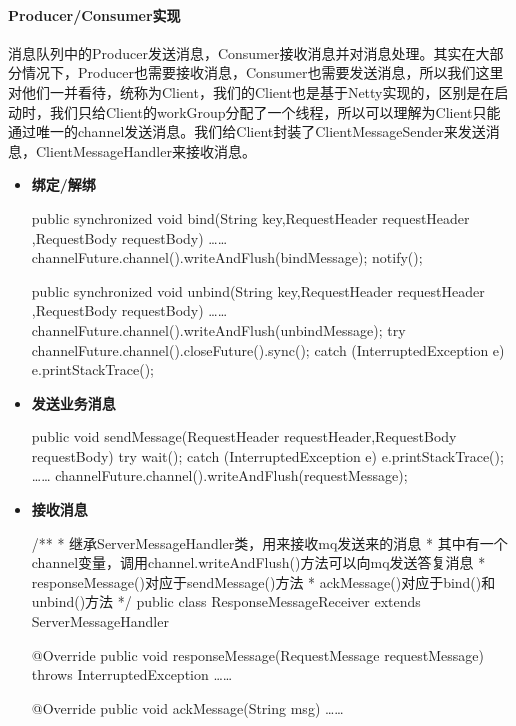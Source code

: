 \documentclass[a4paper, 12pt]{article}
\theoremstyle{definition}
\begin{document}
\paragraph{Producer/Consumer实现}
消息队列中的Producer发送消息，Consumer接收消息并对消息处理。其实在大部分情况下，Producer也需要接收消息，Consumer也需要发送消息，所以我们这里对他们一并看待，统称为Client，我们的Client也是基于Netty实现的，区别是在启动时，我们只给Client的workGroup分配了一个线程，所以可以理解为Client只能通过唯一的channel发送消息。我们给Client封装了ClientMessageSender来发送消息，ClientMessageHandler来接收消息。
\begin{itemize}
    \item {\textbf{绑定/解绑}}\\
\begin{scala}
    public synchronized void bind(String key,RequestHeader requestHeader
                          ,RequestBody requestBody){
           ……
           channelFuture.channel().writeAndFlush(bindMessage);
           notify();
    }

    public synchronized void unbind(String key,RequestHeader requestHeader
                            ,RequestBody requestBody){
           ……
           channelFuture.channel().writeAndFlush(unbindMessage);
           try {
                channelFuture.channel().closeFuture().sync();
           } catch (InterruptedException e) {
                e.printStackTrace();
           }
    }
\end{scala}
    \item {\textbf{发送业务消息}}\\
\begin{scala}
    public void sendMessage(RequestHeader requestHeader,RequestBody requestBody){
        try {
           wait();
        } catch (InterruptedException e) {
           e.printStackTrace();
        }
        ……
        channelFuture.channel().writeAndFlush(requestMessage);
    }
\end{scala}
    \item {\textbf{接收消息}}\\
\begin{scala}
  /**
   * 继承ServerMessageHandler类，用来接收mq发送来的消息
   * 其中有一个channel变量，调用channel.writeAndFlush()方法可以向mq发送答复消息
   * responseMessage()对应于sendMessage()方法
   * ackMessage()对应于bind()和unbind()方法
   */
   public class ResponseMessageReceiver extends ServerMessageHandler {
    @Override
    public void responseMessage(RequestMessage requestMessage) throws InterruptedException {
       ……
    }

    @Override
    public void ackMessage(String msg) {
        ……
    }
}
\end{scala}
\end{itemize}
\end{document}
